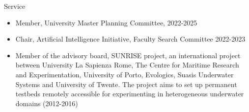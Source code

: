 \begin{category}{Service}
\begin{itemize}
\item Member, University Master Planning Committee, 2022-2025

\item Chair, Artificial Intelligence Initiative, Faculty Search Committee 2022-2023



\end{itemize}



%
%

\begin{itemize}

\item Member of the advisory board, SUNRISE project, an international project between University La Sapienza Rome, The Centre for Maritime Research and Experimentation, University of Porto,  Evologics, Suasis Underwater Systems and University of Twente. The project aims to set up permanent testbeds remotely accessible for experimenting in heterogeneous underwater domains (2012-2016)

\end{itemize}


\end{category}
